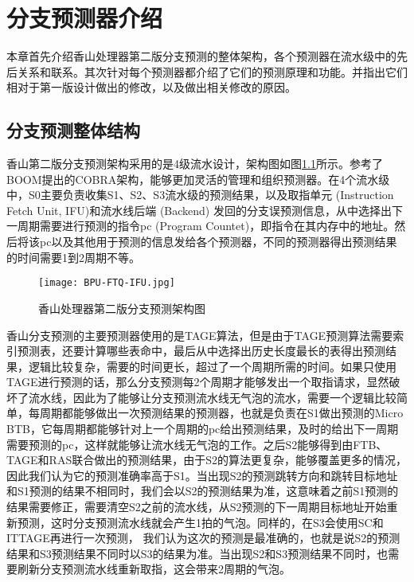 \chapter{分支预测器介绍}


本章首先介绍香山处理器第二版分支预测的整体架构，各个预测器在流水级中的先后关系和联系。其次针对每个预测器都介绍了它们的预测原理和功能。并指出它们相对于第一版设计做出的修改，以及做出相关修改的原因。

\section{分支预测整体结构}

香山第二版分支预测架构采用的是4级流水设计，架构图如图\ref{fig:figure21}所示。参考了BOOM提出的COBRA架构\cite{cobra}，能够更加灵活的管理和组织预测器。在4个流水级中，S0主要负责收集S1、S2、S3流水级的预测结果，以及取指单元 (Instruction Fetch Unit, IFU)和流水线后端 (Backend) 发回的分支误预测信息，从中选择出下一周期需要进行预测的指令pc (Program Countet)，即指令在其内存中的地址。然后将该pc以及其他用于预测的信息发给各个预测器，不同的预测器得出预测结果的时间需要1到2周期不等。

\begin{figure}[htb]
	\centering
	\setlength\tabcolsep{3pt}  %
	\vspace{5pt} %
	\texttt{[image: BPU-FTQ-IFU.jpg]}
	\caption{香山处理器第二版分支预测架构图}
	\label{fig:figure21}
\end{figure}

香山分支预测的主要预测器使用的是TAGE算法\cite{tage-sc-l}，但是由于TAGE预测算法需要索引预测表，还要计算哪些表命中，最后从中选择出历史长度最长的表得出预测结果，逻辑比较复杂，需要的时间更长，超过了一个周期所需的时间。如果只使用TAGE进行预测的话，那么分支预测每2个周期才能够发出一个取指请求，显然破坏了流水线，因此为了能够让分支预测流水线无气泡的流水，需要一个逻辑比较简单，每周期都能够做出一次预测结果的预测器，也就是负责在S1做出预测的Micro BTB，它每周期都能够针对上一个周期的pc给出预测结果，及时的给出下一周期需要预测的pc，这样就能够让流水线无气泡的工作。之后S2能够得到由FTB、TAGE和RAS联合做出的预测结果，由于S2的算法更复杂，能够覆盖更多的情况，因此我们认为它的预测准确率高于S1。当出现S2的预测跳转方向和跳转目标地址和S1预测的结果不相同时，我们会以S2的预测结果为准，这意味着之前S1预测的结果需要修正，需要清空S2之前的流水线，从S2预测的下一周期目标地址开始重新预测，这时分支预测流水线就会产生1拍的气泡。同样的，在S3会使用SC和ITTAGE再进行一次预测， 我们认为这次的预测是最准确的，也就是说S2的预测结果和S3预测结果不同时以S3的结果为准。当出现S2和S3预测结果不同时，也需要刷新分支预测流水线重新取指，这会带来2周期的气泡。

